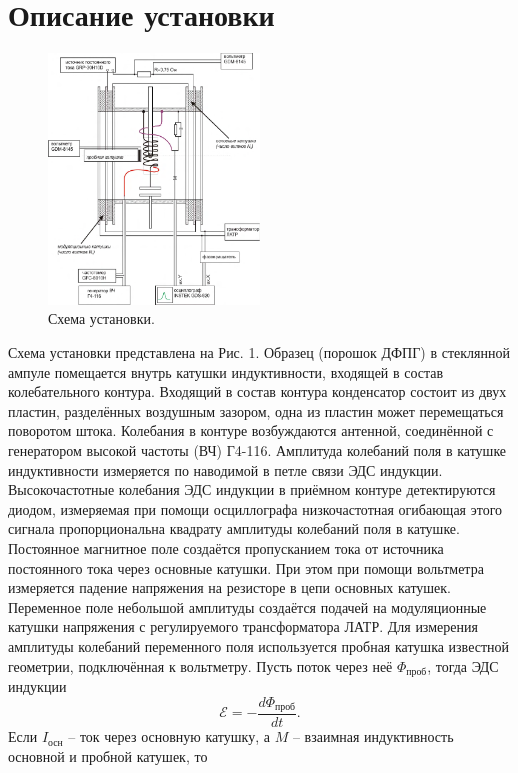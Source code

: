 \documentclass[a4paper,12pt]{article}
\begin{document}
    \section*{Описание установки}
    \begin{figure}
        \includegraphics[width = 0.5\textwidth]{ustanovka.pdf}
        \centering
    \caption{Схема установки.}
    \end{figure}
    Схема установки представлена на Рис. 1. Образец (порошок ДФПГ) в стеклянной ампуле помещается внутрь катушки индуктивности, входящей в состав колебательного контура. Входящий в состав контура конденсатор состоит из двух пластин, разделённых воздушным зазором, одна из пластин может перемещаться поворотом штока. Колебания в контуре возбуждаются антенной, соединённой с генератором высокой частоты (ВЧ) Г4-116. Амплитуда колебаний поля в катушке индуктивности
    измеряется по наводимой в петле связи ЭДС индукции. Высокочастотные колебания ЭДС
    индукции в приёмном контуре детектируются диодом, измеряемая при помощи
    осциллографа низкочастотная огибающая этого сигнала пропорциональна квадрату
    амплитуды колебаний поля в катушке.\\
    Постоянное магнитное поле создаётся пропусканием тока от источника постоянного тока через основные катушки. При этом при помощи вольтметра измеряется падение напряжения на резисторе в цепи основных катушек. Переменное поле небольшой амплитуды создаётся подачей на модуляционные катушки напряжения с регулируемого трансформатора ЛАТР. Для измерения амплитуды колебаний переменного поля используется пробная катушка известной геометрии, подключённая к вольтметру. Пусть поток через неё $\Phi_{\text{проб}}$, тогда ЭДС индукции
    \[\mathcal{E} = - \dfrac{d\Phi_{\text{проб}}}{dt}.\]
    Если $I_{\text{осн}}$ -- ток через основную катушку, а $M$ -- взаимная индуктивность основной и пробной катушек, то
\end{document}
